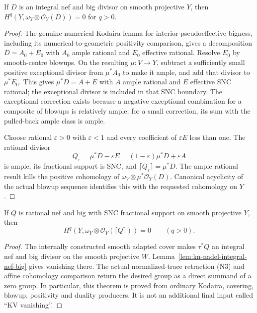 \begin{lemma}
\label{lem:kn-nadel-integral-nef-big}
\notready
If $D$ is an integral nef and big divisor on smooth projective $Y$,
then $H^q(Y,\omega_Y\otimes\mathcal O_Y(D))=0$ for $q>0$.
\end{lemma}
\begin{proof}
The genuine numerical Kodaira lemma for interior-pseudoeffective
bigness, including its numerical-to-geometric positivity comparison,
gives a decomposition $D=A_0+E_0$ with $A_0$ ample rational and
$E_0$ effective rational.  Resolve $E_0$ by smooth-centre blowups.
On the resulting $\mu:V\to Y$, subtract a sufficiently small positive
exceptional divisor from $\mu^*A_0$ to make it ample, and add that
divisor to $\mu^*E_0$.  This gives
$\mu^*D=A+E$ with $A$ ample rational and $E$ effective SNC rational;
the exceptional divisor is included in that SNC boundary.  The
exceptional correction exists because a negative exceptional
combination for a composite of blowups is relatively ample; for a
small correction, its sum with the pulled-back ample class is ample.

Choose rational $\varepsilon>0$ with $\varepsilon<1$ and every
coefficient of $\varepsilon E$ less than one.  The rational divisor
\[
 Q_\varepsilon=\mu^*D-\varepsilon E
              =(1-\varepsilon)\mu^*D+\varepsilon A
\]
is ample, its fractional support is SNC, and
$\lceil Q_\varepsilon\rceil=\mu^*D$.  The ample rational result kills
the positive cohomology of $\omega_V\otimes\mu^*\mathcal O_Y(D)$.
Canonical acyclicity of the actual blowup sequence identifies this
with the requested cohomology on $Y$.
\end{proof}

\begin{theorem}
\label{thm:kn-nadel-snc-kv}
\notready
If $Q$ is rational nef and big with SNC fractional support on smooth
projective $Y$, then
\[
 H^q(Y,\omega_Y\otimes\mathcal O_Y(\lceil Q\rceil))=0
 \qquad(q>0).
\]
\end{theorem}
\begin{proof}
The internally constructed smooth adapted cover makes $\tau^*Q$
an integral nef and big divisor on the smooth projective $W$.
Lemma~\ref{lem:kn-nadel-integral-nef-big} gives vanishing there.
The actual normalized-trace retraction (N3) and affine cohomology
comparison return the desired group as a direct summand of a zero
group.  In particular, this theorem is proved from ordinary Kodaira,
covering, blowup, positivity and duality producers.  It is not an
additional final input called ``KV vanishing''.
\end{proof}

